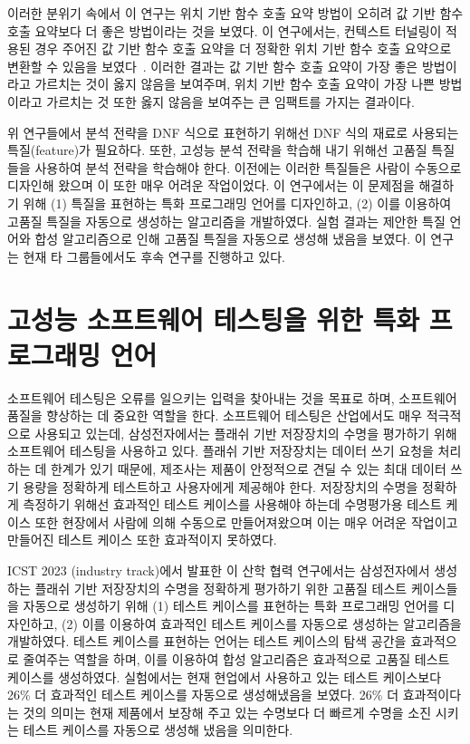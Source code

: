 \documentclass[11pt]{article}
\newcommand{\myparagraph}[1]{\medskip\noindent{\it \textbf{#1.}}}
\begin{document}
\begin{spacing}{1.145}
이러한 분위기 속에서 이 연구는 위치 기반 함수 호출 요약 방법이 오히려 값 기반 함수 호출 요약보다 더 좋은 방법이라는 것을 보였다.
%
이 연구에서는, 컨텍스트 터널링이 적용된 경우 주어진 값 기반 함수 호출 요약을 더 정확한 위치 기반 함수 호출 요약으로 변환할 수 있음을 보였다~\cite{JeOh22}.
%
이러한 결과는 값 기반 함수 호출 요약이 가장 좋은 방법이라고 가르치는 것이 옳지 않음을 보여주며, 위치 기반 함수 호출 요약이 가장 나쁜 방법이라고 가르치는 것 또한 옳지 않음을 보여주는 큰 임팩트를 가지는 결과이다.




\myparagraph{특질 자동 생성을 위한 특질 언어 및 합성 알고리즘~\cite{Jeon20}}
위 연구들에서 분석 전략을 DNF 식으로 표현하기 위해선 DNF 식의 재료로 사용되는 특질(feature)가 필요하다.
%
또한, 고성능 분석 전략을 학습해 내기 위해선 고품질 특질들을 사용하여 분석 전략을 학습해야 한다.
%
이전에는 이러한 특질들은 사람이 수동으로 디자인해 왔으며 이 또한 매우 어려운 작업이었다.
%
이 연구에서는 이 문제점을 해결하기 위해 (1) 특질을 표현하는 특화 프로그래밍 언어를 디자인하고, (2) 이를 이용하여 고품질 특질을 자동으로 생성하는 알고리즘을 개발하였다.
%
실험 결과는 제안한 특질 언어와 합성 알고리즘으로 인해 고품질 특질을 자동으로 생성해 냈음을 보였다.
%
이 연구는 현재 타 그룹들에서도 후속 연구를 진행하고 있다.



\section{고성능 소프트웨어 테스팅을 위한 특화 프로그래밍 언어}
%
소프트웨어 테스팅은 오류를 일으키는 입력을 찾아내는 것을 목표로 하며, 소프트웨어 품질을 향상하는 데 중요한 역할을 한다.
%
소프트웨어 테스팅은 산업에서도 매우 적극적으로 사용되고 있는데, 삼성전자에서는 플래쉬 기반 저장장치의 수명을 평가하기 위해 소프트웨어 테스팅을 사용하고 있다.
%
플래쉬 기반 저장장치는 데이터 쓰기 요청을 처리하는 데 한계가 있기 때문에, 제조사는 제품이 안정적으로 견딜 수 있는 최대 데이터 쓰기 용량을 정확하게 테스트하고 사용자에게 제공해야 한다.
%
저장장치의 수명을 정확하게 측정하기 위해선 효과적인 테스트 케이스를 사용해야 하는데 수명평가용 테스트 케이스 또한 현장에서 사람에 의해 수동으로 만들어져왔으며 이는 매우 어려운 작업이고 만들어진 테스트 케이스 또한 효과적이지 못하였다.


ICST 2023 (industry track)에서 발표한 이 산학 협력 연구에서는 삼성전자에서 생성하는 플래쉬 기반 저장장치의 수명을 정확하게 평가하기 위한 고품질 테스트 케이스들을 자동으로 생성하기 위해 (1) 테스트 케이스를 표현하는 특화 프로그래밍 언어를 디자인하고, (2) 이를 이용하여 효과적인 테스트 케이스를 자동으로 생성하는 알고리즘을 개발하였다.
%
테스트 케이스를 표현하는 언어는 테스트 케이스의 탐색 공간을 효과적으로 줄여주는 역할을 하며, 이를 이용하여 합성 알고리즘은 효과적으로 고품질 테스트 케이스를 생성하였다.
%
실험에서는 현재 현업에서 사용하고 있는 테스트 케이스보다 26\% 더 효과적인 테스트 케이스를 자동으로 생성해냈음을 보였다.
%
26\% 더 효과적이다는 것의 의미는 현재 제품에서 보장해 주고 있는 수명보다 더 빠르게 수명을 소진 시키는 테스트 케이스를 자동으로 생성해 냈음을 의미한다.






\end{spacing}
\end{document}
